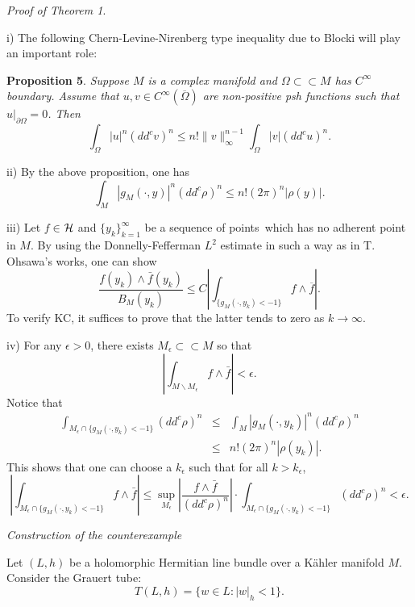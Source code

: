 \documentclass[12pt]{article}
\begin{document}
\bigskip

\emph{Proof of Theorem 1}.

i) The following Chern-Levine-Nirenberg type inequality due to
Blocki will play an important role:

\bigskip

\textbf{Proposition 5}. \emph{ Suppose $M$ is a complex manifold
and $\Omega\subset\subset M$ has $C^\infty$ boundary. Assume that
$u,v\in C^\infty(\overline{\Omega})$ are non-positive psh
functions such that $u|_{\partial \Omega}=0$. Then }
$$
\int_\Omega |u|^n (dd^c v)^n\le n! \|v\|_\infty^{n-1} \int_\Omega
|v|(dd^c u)^n.
$$

\bigskip

ii) By the above proposition, one has
$$
\int_M |g_M(\cdot,y)|^n (dd^c\rho)^n\le n! (2\pi)^n |\rho(y)|.
$$

iii) Let $f\in ${\em ${\cal H}$ }and {\em $\{y_k\}_{k=1}^\infty $
}be a sequence of points{\em \ }which has no adherent point in
$M$. By using the Donnelly-Fefferman $L^2$ estimate in such a way
as in T. Ohsawa's works, one can show
$$
\frac{f(y_{k})\wedge \bar f(y_{k})}{B_M(y_{k})}\leq C \left|
\int_{\{g_M(\cdot,y_k)<-1\}}f\wedge
 \overline{f}\right|.
$$
To verify KC, it suffices to prove that the latter tends to zero
as $k\rightarrow \infty$.

iv) For any $\epsilon>0$, there exists $M_\epsilon\subset\subset M
$ so that
$$
\left|\int_{M\backslash M_\epsilon}f\wedge
\bar{f}\right|<\epsilon.
$$
Notice that
\begin{eqnarray*}
\int_{M_\epsilon\cap \{g_M(\cdot,y_k)<-1\}} (dd^c\rho)^n &\le &
\int_M
|g_M(\cdot,y_k)|^n (dd^c\rho)^n\\
&\le & n! (2\pi)^n |\rho(y_k)|.
\end{eqnarray*}
This shows that one can choose a $k_\epsilon$ such that for all
$k>k_\epsilon$,
$$
\left|\int_{M_\epsilon\cap \{g_M(\cdot,y_k)<-1\}} f\wedge \bar{f}
\right|\le \sup_{M_\epsilon}\left|\frac{f\wedge \bar{f}}{(dd^c
\rho )^n}\right|\cdot \int_{M_\epsilon\cap \{g_M(\cdot,y_k)<-1\}}
(dd^c\rho)^n<\epsilon.
$$

\bigskip

\emph{Construction of the counterexample}

\bigskip

Let  $(L,h)$ be a holomorphic Hermitian line bundle over a
K\"ahler manifold $M$. Consider the Grauert tube:
$$
T(L,h)=\{w\in L:|w|_h<1\}.
$$
\end{document}
